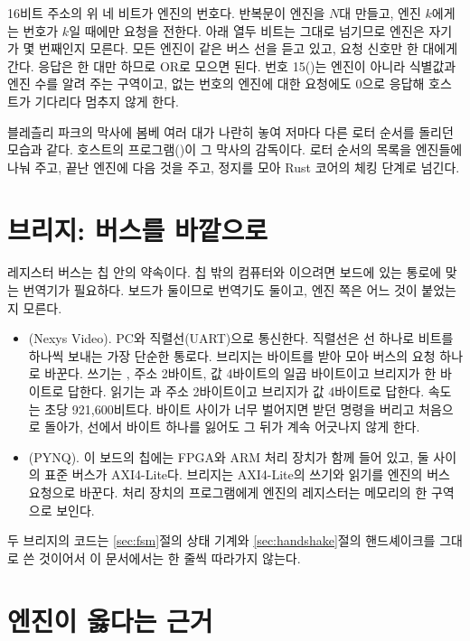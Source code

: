 \Ours 16비트 주소의 위 네 비트가 엔진의 번호다.  반복문이 엔진을 $N$대 만들고, 엔진 $k$에게는
번호가 $k$일 때에만 요청을 전한다. 아래 열두 비트는 그대로 넘기므로 엔진은 자기가 몇 번째인지 모른다.
모든 엔진이 같은 버스 선을 듣고 있고, 요청 신호만 한 대에게 간다. 응답은 한 대만 하므로 OR로 모으면 된다.
번호 15()는 엔진이 아니라 식별값과 엔진 수를 알려 주는 구역이고, 없는 번호의 엔진에 대한
요청에도 0으로 응답해 호스트가 기다리다 멈추지 않게 한다.

블레츨리 파크의 막사에 봄베 여러 대가 나란히 놓여 저마다 다른 로터 순서를 돌리던 모습과 같다. 호스트의
프로그램()이 그 막사의 감독이다. 로터 순서의 목록을 엔진들에 나눠 주고, 끝난 엔진에
다음 것을 주고, 정지를 모아 Rust 코어의 체킹 단계로 넘긴다.

\section{브리지: 버스를 바깥으로}\label{sec:e-bridge}

레지스터 버스는 칩 안의 약속이다. 칩 밖의 컴퓨터와 이으려면 보드에 있는 통로에 맞는 번역기가 필요하다.
보드가 둘이므로 번역기도 둘이고, 엔진 쪽은 어느 것이 붙었는지 모른다.

\begin{itemize}
\item \textbf{} (Nexys Video). PC와 직렬선(UART)으로 통신한다. 직렬선은 선 하나로 비트를
하나씩 보내는 가장 단순한 통로다. 브리지는 바이트를 받아 모아 버스의 요청 하나로 바꾼다. 쓰기는
, 주소 2바이트, 값 4바이트의 일곱 바이트이고 브리지가 한 바이트로 답한다. 읽기는 과
주소 2바이트이고 브리지가 값 4바이트로 답한다. 속도는 초당 921,600비트다. 바이트 사이가 너무 벌어지면 받던
명령을 버리고 처음으로 돌아가, 선에서 바이트 하나를 잃어도 그 뒤가 계속 어긋나지 않게 한다.
\item \textbf{} (PYNQ). 이 보드의 칩에는 FPGA와 ARM 처리 장치가 함께 들어 있고, 둘
사이의 표준 버스가 AXI4-Lite다. 브리지는 AXI4-Lite의 쓰기와 읽기를 엔진의 버스 요청으로 바꾼다. 처리 장치의
프로그램에게 엔진의 레지스터는 메모리의 한 구역으로 보인다.
\end{itemize}

두 브리지의 코드는 \ref{sec:fsm}절의 상태 기계와 \ref{sec:handshake}절의 핸드셰이크를 그대로 쓴 것이어서
이 문서에서는 한 줄씩 따라가지 않는다.

\section{엔진이 옳다는 근거}\label{sec:e-verify}

